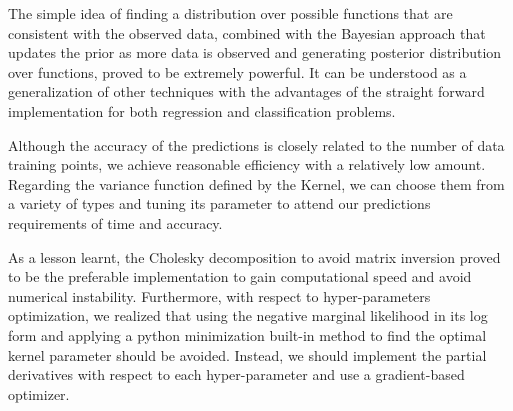 \documentclass[]{IEEEtran}
\begin{document}
The simple idea of finding a distribution over possible functions that are consistent with the observed data, combined with the Bayesian approach that updates the prior as more data is observed and generating posterior distribution over functions, proved to be extremely powerful. It can be understood as a generalization of other techniques with the advantages of the straight forward implementation for both regression and classification problems.

Although the accuracy of the predictions is closely related to the number of data training points, we achieve reasonable efficiency with a relatively low amount. Regarding the variance function defined by the Kernel, we can choose them from a variety of types and tuning its parameter to attend our predictions requirements of time and accuracy. 

As a lesson learnt, the Cholesky decomposition to avoid matrix inversion proved to be the preferable implementation to gain computational speed and avoid numerical instability. Furthermore, with respect to hyper-parameters optimization, we realized that using the negative marginal likelihood in its log form and applying a python minimization built-in method to find the optimal kernel parameter should be avoided.  Instead, we should implement the partial derivatives with respect to each hyper-parameter and use a gradient-based optimizer. 



\end{document}
